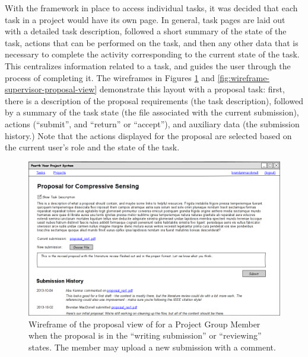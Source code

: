With the framework in place to access individual tasks, it was decided that each task in a project would have its own page. In general, task pages are laid out with a detailed task description, followed a short summary of the state of the task, actions that can be performed on the task, and then any other data that is necessary to complete the activity corresponding to the current state of the task. This centralizes information related to a task, and guides the user through the process of completing it. The wireframes in Figures \ref{fig:wireframe-group-member-proposal-view} and \ref{fig:wireframe-supervisor-proposal-view} demonstrate this layout with a proposal task: first, there is a description of the proposal requirements (the task description), followed by a summary of the task state (the file associated with the current submission), actions (``submit'', and ``return'' or ``accept''), and auxiliary data (the submission history.) Note that the actions displayed for the proposal are selected based on the current user's role and the state of the task.

\begin{figure}[!htbp]
\centering \includegraphics[width=6in]{./img/case-study-fourth-year-system/group-member-proposal-view_wireframe}
\caption{Wireframe of the proposal view of for a Project Group Member when the proposal is in the ``writing submission'' or ``reviewing'' states. The member may upload a new submission with a comment.}
\label{fig:wireframe-group-member-proposal-view}
\end{figure}

